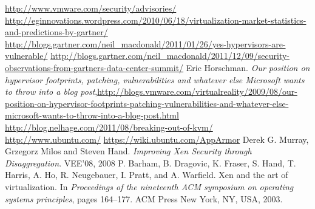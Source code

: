 {}
\begin{thebibliography}{99}
 \url{http://www.vmware.com/security/advisories/}
\bibitem{} \url{http://eginnovations.wordpress.com/2010/06/18/virtualization-market-statistics-and-predictions-by-gartner/}
 \url{http://blogs.gartner.com/neil\_macdonald/2011/01/26/yes-hypervisors-are-vulnerable/}
\bibitem{}
\url{http://blogs.gartner.com/neil\_macdonald/2011/12/09/security-observations-from-gartners-data-center-summit/}
 Eric Horschman. \emph{Our position on hypervisor
footprints, patching, vulnerabilities and whatever else Microsoft wants to throw
into a blog post},\url{http://blogs.vmware.com/virtualreality/2009/08/our-position-on-hypervisor-footprints-patching-vulnerabilities-and-whatever-else-microsoft-wants-to-throw-into-a-blog-post.html}
 \url{http://blog.nelhage.com/2011/08/breaking-out-of-kvm/}
 \url{http://www.ubuntu.com/}
 \url{https://wiki.ubuntu.com/AppArmor}
 Derek G. Murray, Grzegorz Milos and Steven Hand.
\emph{Improving Xen Security through Disaggregation}. VEE’08, 2008
 P. Barham, B. Dragovic, K. Fraser, S. Hand, T. Harris, A. Ho, R.
Neugebauer, I. Pratt, and A. Warfield. Xen and the art of virtualization. In
\emph{Proceedings of the nineteenth ACM symposium on operating systems
principles}, pages 164–177. ACM Press New York, NY, USA, 2003.
\end{thebibliography}
